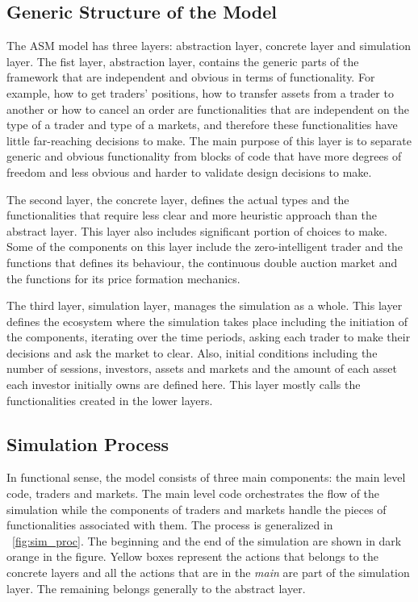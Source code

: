 \subsection{Generic Structure of the Model}
The ASM model has three layers: abstraction layer, concrete 
layer and simulation layer. The fist layer, abstraction layer, contains the 
generic parts of the framework that are independent and obvious in terms
of functionality. For example, how to get traders' positions, how to
transfer assets from a trader to another or how to cancel an order are
functionalities that are independent on the type of a trader 
and type of a markets, and therefore these functionalities have little
far-reaching decisions to make. The main purpose of this layer
is to separate generic and obvious functionality from blocks of code
that have more degrees of freedom and less obvious and harder to validate 
design decisions to make.

The second layer, the concrete layer, defines the actual types and the
functionalities that require less clear and more heuristic
approach than the abstract layer. This layer also includes significant
portion of choices to make. Some of the components
on this layer include the zero-intelligent trader and the
functions that defines its behaviour, the continuous double auction
market and the functions for its price formation mechanics.

The third layer, simulation layer, manages the simulation as a whole.
This layer defines the ecosystem where the simulation takes place including
the initiation of the components, iterating over the time periods, asking
each trader to make their decisions and ask the market to clear. 
Also, initial conditions including the number of sessions, investors, assets and markets
and the amount of each asset each investor initially owns are defined here. 
This layer mostly calls the functionalities created in the lower layers.



\subsection{Simulation Process}
In functional sense, the model consists of three main components:
the main level code, traders and markets. The main level code 
orchestrates the flow of the simulation while the components of traders 
and markets handle the pieces of functionalities associated with them. The process
is generalized in ~\ref{fig:sim_proc}. The beginning and the end of the 
simulation are shown in dark orange in the figure. Yellow boxes represent
the actions that belongs to the concrete layers and all the actions that
are in the \textit{main} are part of the simulation layer. The remaining belongs
generally to the abstract layer.


